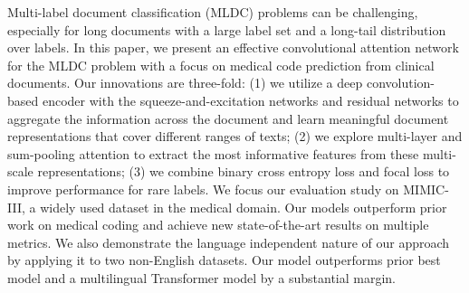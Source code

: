 Multi-label document classification (MLDC) problems can be challenging, especially for long documents with a large label set and a long-tail distribution over labels. In this paper, we present an effective convolutional attention network for the MLDC problem with a focus on medical code prediction from clinical documents. Our innovations are three-fold: (1) we utilize a deep convolution-based encoder with the squeeze-and-excitation networks and residual networks to aggregate the information across the document and learn meaningful document representations that cover different ranges of texts; (2) we explore multi-layer and sum-pooling attention to extract the most informative features from these multi-scale representations; (3) we combine binary cross entropy loss and focal loss to improve performance for rare labels. We focus our evaluation study on MIMIC-III, a widely used dataset in the medical domain. Our models outperform prior work on medical coding and achieve new state-of-the-art results on multiple metrics. We also demonstrate the language independent nature of our approach by applying it to two non-English datasets. Our model outperforms prior best model and a multilingual Transformer model by a substantial margin.
